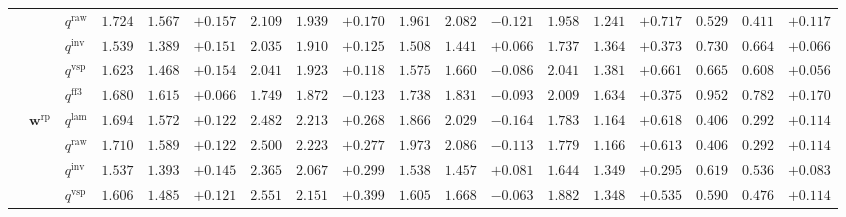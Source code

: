 \documentclass{article}
\begin{document}
\begin{table}[!htbp]
{\begin{tabular}{lll ccc ccc ccc ccc ccc}
 &  & $q^{\mathrm{raw}}$ & $1.724$ & $1.567$ & \cellcolor{posgreen!50}$+0.157$ & $2.109$ & $1.939$ & \cellcolor{posgreen!50}$+0.170$ & $1.961$ & $2.082$ & \cellcolor{negred!50}$-0.121$ & $1.958$ & $1.241$ & \cellcolor{posgreen!50}$+0.717$ & $0.529$ & $0.411$ & \cellcolor{posgreen!50}$+0.117$ \\
 &  & $q^{\mathrm{inv}}$ & $1.539$ & $1.389$ & \cellcolor{posgreen!50}$+0.151$ & $2.035$ & $1.910$ & \cellcolor{posgreen!50}$+0.125$ & $1.508$ & $1.441$ & \cellcolor{posgreen!50}$+0.066$ & $1.737$ & $1.364$ & \cellcolor{posgreen!50}$+0.373$ & $0.730$ & $0.664$ & \cellcolor{posgreen!50}$+0.066$ \\
 &  & $q^{\mathrm{vsp}}$ & $1.623$ & $1.468$ & \cellcolor{posgreen!50}$+0.154$ & $2.041$ & $1.923$ & \cellcolor{posgreen!50}$+0.118$ & $1.575$ & $1.660$ & \cellcolor{negred!50}$-0.086$ & $2.041$ & $1.381$ & \cellcolor{posgreen!50}$+0.661$ & $0.665$ & $0.608$ & \cellcolor{posgreen!50}$+0.056$ \\
 &  & $q^{\mathrm{ff3}}$ & $1.680$ & $1.615$ & \cellcolor{posgreen!50}$+0.066$ & $1.749$ & $1.872$ & \cellcolor{negred!50}$-0.123$ & $1.738$ & $1.831$ & \cellcolor{negred!50}$-0.093$ & $2.009$ & $1.634$ & \cellcolor{posgreen!50}$+0.375$ & $0.952$ & $0.782$ & \cellcolor{posgreen!50}$+0.170$ \\
\cmidrule(lr){2-18}
 & $\mathbf{w}^{\mathrm{rp}}$ & $q^{\mathrm{lam}}$ & $1.694$ & $1.572$ & \cellcolor{posgreen!50}$+0.122$ & $2.482$ & $2.213$ & \cellcolor{posgreen!50}$+0.268$ & $1.866$ & $2.029$ & \cellcolor{negred!50}$-0.164$ & $1.783$ & $1.164$ & \cellcolor{posgreen!50}$+0.618$ & $0.406$ & $0.292$ & \cellcolor{posgreen!50}$+0.114$ \\
 &  & $q^{\mathrm{raw}}$ & $1.710$ & $1.589$ & \cellcolor{posgreen!50}$+0.122$ & $2.500$ & $2.223$ & \cellcolor{posgreen!50}$+0.277$ & $1.973$ & $2.086$ & \cellcolor{negred!50}$-0.113$ & $1.779$ & $1.166$ & \cellcolor{posgreen!50}$+0.613$ & $0.406$ & $0.292$ & \cellcolor{posgreen!50}$+0.114$ \\
 &  & $q^{\mathrm{inv}}$ & $1.537$ & $1.393$ & \cellcolor{posgreen!50}$+0.145$ & $2.365$ & $2.067$ & \cellcolor{posgreen!50}$+0.299$ & $1.538$ & $1.457$ & \cellcolor{posgreen!50}$+0.081$ & $1.644$ & $1.349$ & \cellcolor{posgreen!50}$+0.295$ & $0.619$ & $0.536$ & \cellcolor{posgreen!50}$+0.083$ \\
 &  & $q^{\mathrm{vsp}}$ & $1.606$ & $1.485$ & \cellcolor{posgreen!50}$+0.121$ & $2.551$ & $2.151$ & \cellcolor{posgreen!50}$+0.399$ & $1.605$ & $1.668$ & \cellcolor{negred!50}$-0.063$ & $1.882$ & $1.348$ & \cellcolor{posgreen!50}$+0.535$ & $0.590$ & $0.476$ & \cellcolor{posgreen!50}$+0.114$ \\

\end{tabular}}
\end{table}
\end{document}
